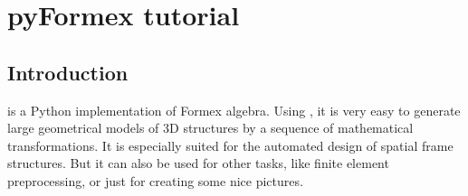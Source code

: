 
\chapter{pyFormex tutorial}
\label{cha:tutorial}


\section{Introduction}
\label{sec:intro-tut}

\pyformex is a Python implementation of Formex algebra. Using \pyformex, it is very easy to  generate large geometrical models of 3D structures by a sequence of mathematical transformations. It is especially suited for the automated design of spatial frame structures. But it can also be used for other tasks, like finite element preprocessing, or just for creating some nice pictures.


